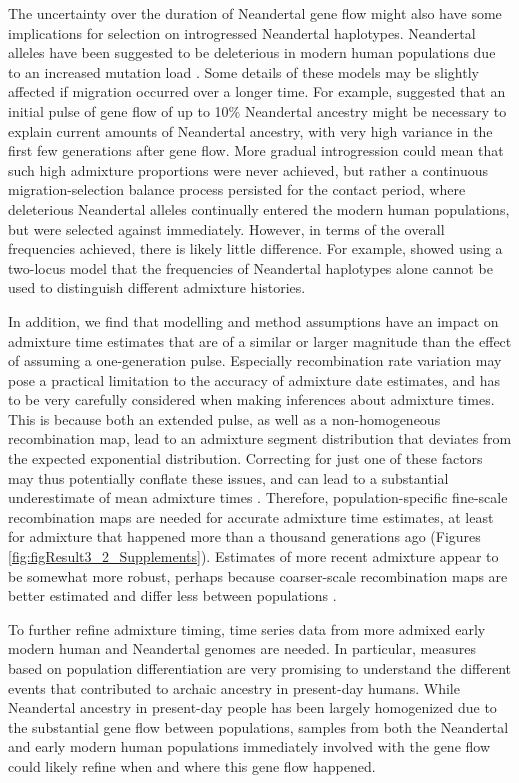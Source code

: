 \documentclass[11pt]{article}
\begin{document}
The uncertainty over the duration of Neandertal gene flow might also have some implications for selection on introgressed Neandertal haplotypes. Neandertal alleles have been suggested to be deleterious in modern human populations due to an increased mutation load \citep{harris_genetic_2016, juric_strength_2016}. Some details of these models may be slightly affected if migration occurred over a longer time. For example, \cite{harris_genetic_2016} suggested that an initial pulse of gene flow of up to 10\% Neandertal ancestry might be necessary to explain current amounts of Neandertal ancestry, with very high variance in the first few generations after gene flow. More gradual introgression could mean that such high admixture proportions were never achieved, but rather a continuous migration-selection balance process persisted for the contact period, where deleterious Neandertal alleles continually entered the modern human populations, but were selected against immediately. 
However, in terms of the overall frequencies achieved, there is likely little difference. For example, \cite{juric_strength_2016} showed using a two-locus model that the frequencies of Neandertal haplotypes alone cannot be used to distinguish different admixture histories.

In addition, we find that modelling and method assumptions have an impact on admixture time estimates that are of a similar or larger magnitude than the effect of assuming a one-generation pulse. Especially recombination rate variation may pose a practical limitation to the accuracy of admixture date estimates, and has to be very carefully considered when making inferences about admixture times. This is because both an extended pulse, as well as a non-homogeneous recombination map, lead to an admixture segment distribution that deviates from the expected exponential distribution. Correcting for just one of these factors may thus potentially conflate these issues, and can lead to a substantial underestimate of mean admixture times \citep{sankararaman_date_2012}. Therefore, population-specific fine-scale recombination maps are needed for accurate admixture time estimates, at least for admixture that happened more than a thousand generations ago (Figures \ref{fig:figResult3_2_Supplements}). Estimates of more recent admixture appear to be somewhat more robust, perhaps because coarser-scale recombination maps are better estimated and differ less between populations \citep{hinch_landscape_2011}. 


To further refine admixture timing, time series data from more admixed early modern human and Neandertal genomes are  needed. In particular, measures based on population differentiation  \citep[e.g][]{wall_higher_2013,browning_analysis_2018,villanea_multiple_2019} are very promising to understand the different events that contributed to archaic ancestry in present-day humans. While Neandertal ancestry in present-day people has been largely homogenized due to the substantial gene flow between populations, samples from both the Neandertal and early modern human populations immediately involved with the gene flow could likely refine when and where this gene flow happened. 
\end{document}
